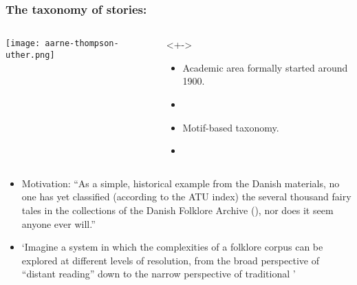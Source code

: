 \begin{frame}

  \frametitle{The taxonomy of stories:}

  \begin{columns}
    \texttt{[image: aarne-thompson-uther.png]}
    \begin{block}<+->{}
      \begin{itemize}
      \item
        Academic area formally started around 1900.
      \item
      \item
        Motif-based taxonomy.
      \item
      \end{itemize}
    \end{block}
  \end{columns}
  
\end{frame}

\begin{frame}
  \footnotesize

  \begin{block}{}

    \begin{itemize}
    \item<+->
      Motivation: ``As a simple, historical example from the Danish
      materials, no one has yet classified (according to the ATU index) the
      several thousand fairy tales in the collections of the Danish Folklore
      Archive (),
      nor does it seem anyone ever will.''
    \item<+->
      `Imagine a system in which the complexities of a folklore corpus
      can be explored at different levels of resolution, from the broad
      perspective of ``distant reading'' down to the narrow perspective of
      traditional '
    \end{itemize}
  \end{block}

\end{frame}

